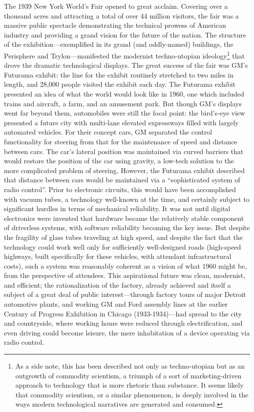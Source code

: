 The 1939 New York World's Fair opened to great acclaim. Covering over
a thousand acres and attracting a total of over 44 million visitors,
the fair was a massive public spectacle demonstrating the technical
prowess of American industry and providing a grand vision for the
future of the nation. The structure of the exhibition---exemplified in
its grand (and oddly-named) buildings, the Perisphere and
Trylon---manifested the modernist techno-utopian ideology\footnote{As a
  side note, this has been described not only as techno-utopian but as
an outgrowth of commodity scientism, a triumph of a sort of
marketing-driven approach to technology that is more rhetoric than
substance.\cite{???-DMsclass} It seems likely that commodity
scientism, or a similar phenomenon, is deeply involved in the ways
modern technological narratives are generated and consumed.} that drove the
dramatic technological displays\cite{???}. The great success of the fair was
GM's Futurama exhibit: the line for the exhibit routinely stretched to
two miles in length, and 28,000 people visited the exhibit each day.
The Futurama exhibit presented an idea of what the world would look
like in 1960, one which included trains and aircraft, a farm, and an
amusement park.\cite{???} But though GM's displays went far beyond them,
automobiles were still the focal point: the bird's-eye view presented a
future city with multi-lane elevated expressways filled with largely
automated vehicles. For their concept cars, GM separated the control
functionality for steering from that for the maintenance of speed and
distance between cars. The car's lateral position was maintained via
curved barriers that would restore the position of the car using
gravity, a low-tech solution to the more complicated problem of
steering. However, the Futurama exhibit described that distance
between cars would be maintained via a ``sophisticated system of radio
control''\cite{???}. Prior to electronic circuits, this would have been
accomplished with vacuum tubes, a technology well-known at the time,
and certainly subject to significant hurdles in terms of mechanical
reliability. It was not until digital electronics were invented that
hardware became the relatively stable component of driverless systems,
with software reliability becoming the key issue\cite{???}. But despite the
fragility of glass tubes traveling at high speed, and despite the fact
that the technology could work well only for sufficiently
well-designed roads (high-speed highways, built specifically for these
vehicles, with attendant infrastructural costs), such a system was
reasonably coherent as a vision of what 1960 might be, from the
perspective of attendees. This aspirational future was clean,
modernist, and efficient; the rationalization of the factory, already
achieved and itself a subject of a great deal of public
interest---through factory tours of major Detroit automotive plants, and
working GM and Ford assembly lines at the earlier Century of Progress
Exhibition in Chicago (1933-1934)\cite{???}---had spread to the city and
countryside, where working hours were reduced through electrification,
and even driving could become leisure, the mere inhabitation of a
device operating via radio control.


